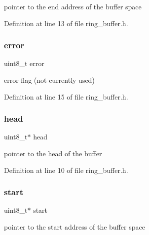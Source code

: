 pointer to the end address of the buffer space 



Definition at line 13 of file ring\+\_\+buffer.\+h.

\hypertarget{structring__buffer__t_adc64ccb7538429fe78e3fe0139267370}{}\label{structring__buffer__t_adc64ccb7538429fe78e3fe0139267370} 
\subsubsection{\texorpdfstring{error}{error}}
{\footnotesize\ttfamily uint8\+\_\+t error}



error flag (not currently used) 



Definition at line 15 of file ring\+\_\+buffer.\+h.

\hypertarget{structring__buffer__t_a102cac6eb6f8f341f1891c0905181491}{}\label{structring__buffer__t_a102cac6eb6f8f341f1891c0905181491} 
\subsubsection{\texorpdfstring{head}{head}}
{\footnotesize\ttfamily uint8\+\_\+t$\ast$ head}



pointer to the head of the buffer 



Definition at line 10 of file ring\+\_\+buffer.\+h.

\hypertarget{structring__buffer__t_a7b78fc8dde7c5c2b76176106e087b1de}{}\label{structring__buffer__t_a7b78fc8dde7c5c2b76176106e087b1de} 
\subsubsection{\texorpdfstring{start}{start}}
{\footnotesize\ttfamily uint8\+\_\+t$\ast$ start}



pointer to the start address of the buffer space 



